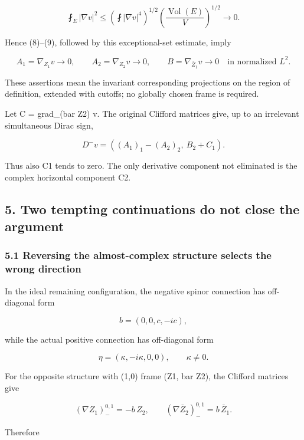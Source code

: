 \[
 \fint_E|\nabla v|^2
 \le\left(\fint|\nabla v|^4\right)^{1/2}
     \left(\frac{\operatorname{Vol}(E)}V\right)^{1/2}\to0.
\]

Hence (8)--(9), followed by this exceptional-set estimate, imply

\[
 A_1=\nabla_{Z_1}v\to0,
 \qquad A_2=\nabla_{Z_2}v\to0,
 \qquad B=\nabla_{\bar Z_1}v\to0
 \quad\text{in normalized }L^2.
\tag{10}
\]

These assertions mean the invariant corresponding projections on the
region of definition, extended with cutoffs; no globally chosen frame is
required.

Let C = grad\_(bar Z2) v. The original Clifford matrices give, up to an
irrelevant simultaneous Dirac sign,

\[
 D^-v=((A_1)_1-(A_2)_2,\ B_2+C_1).
\]

Thus also C1 tends to zero. The only derivative component not eliminated
is the complex horizontal component C2.

\hypertarget{o10prolong:two-tempting-continuations-do-not-close-the-argument}{%
\subsection{5. Two tempting continuations do not close the
argument}\label{o10prolong:two-tempting-continuations-do-not-close-the-argument}}

\hypertarget{o10prolong:reversing-the-almost-complex-structure-selects-the-wrong-direction}{%
\subsubsection{5.1 Reversing the almost-complex structure selects the
wrong
direction}\label{o10prolong:reversing-the-almost-complex-structure-selects-the-wrong-direction}}

In the ideal remaining configuration, the negative spinor connection has
off-diagonal form

\[
 b=(0,0,c,-ic),
\]

while the actual positive connection has off-diagonal form

\[
 \eta=(\kappa,-i\kappa,0,0),\qquad \kappa\ne0.
\]

For the opposite structure with (1,0) frame (Z1, bar Z2), the Clifford
matrices give

\[
 (\nabla Z_1)^{0,1}_-= -b\,Z_2,
 \qquad(\nabla\bar Z_2)^{0,1}_-= b\,\bar Z_1.
\]

Therefore

